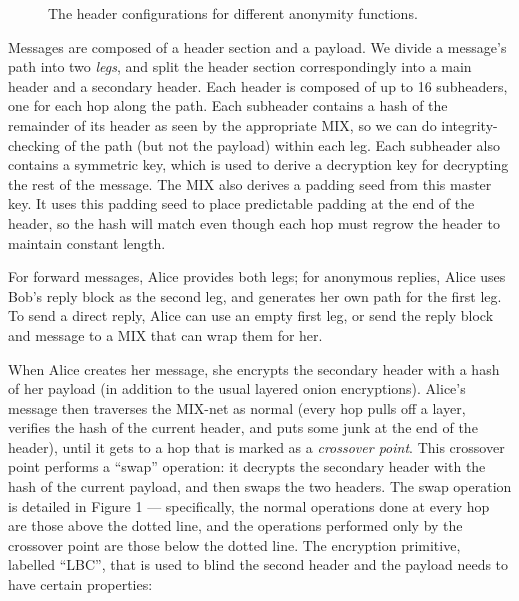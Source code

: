 \documentclass[11pt]{IEEEtran}
\begin{document}
\begin{figure}
\begin{center}
\caption{The header configurations for different anonymity functions.} 
\end{center}
\end{figure}

Messages are composed of a header section and a payload. We divide
a message's path into two \emph{legs}, and split the header section
correspondingly into a main header and a secondary header. Each header
is composed of up to 16 subheaders, one for each hop along the path.
Each subheader contains a hash of the remainder of its header as
seen by the appropriate MIX, so we can do
integrity-checking of the path (but not the payload) within each leg.
Each subheader also contains a symmetric key, which is used to derive a
decryption key for decrypting the rest of the message. The MIX also
derives a padding seed from this master key. It uses this padding seed
to place predictable padding at the end of the header, so the hash will
match even though each hop must regrow the header to maintain constant
length.

For forward messages, Alice provides both legs; for anonymous replies, Alice
uses Bob's reply block as the second leg, and generates her own path
for the first leg.  To send a direct reply, Alice can use an empty
first leg, or send the reply block and message to a MIX that can wrap
them for her.

When Alice creates her message, she encrypts the secondary header
with a hash of her payload (in addition to the usual layered onion
encryptions). Alice's message then traverses the MIX-net as normal (every
hop pulls off a layer, verifies the hash of the current header,
and puts some junk at the end of the header), until it gets to a
hop that is marked as a \emph{crossover point}. This crossover point
performs a ``swap'' operation: it decrypts the secondary header with
the hash of the current payload, and then swaps the two headers. The
swap operation is detailed in Figure 1 --- specifically, the normal
operations done at every hop are those above the dotted line, and the
operations performed only by the crossover point are those below
the dotted line. The encryption primitive, labelled ``LBC'', that is
used to blind the second header and the payload needs to have certain
properties:
\end{document}
